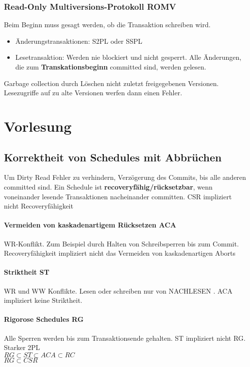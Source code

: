 \documentclass[ngerman]{scrartcl}
\begin{document}
\subsubsection{Read-Only Multiversions-Protokoll ROMV}
Beim Beginn muss gesagt werden, ob die Transaktion schreiben wird. 
\begin{itemize}
  \item Änderungstransaktionen: S2PL oder SSPL
  \item Lesetransaktion: Werden nie blockiert und nicht gesperrt. Alle Änderungen, die zum \textbf{Transkationsbeginn} committed sind, werden gelesen.
\end{itemize} 
Garbage collection durch Löschen nicht zuletzt freigegebenen Versionen. Lesezugriffe auf zu alte Versionen werfen dann einen Fehler. 



\section{Vorlesung}
\subsection{Korrektheit von Schedules mit Abbrüchen}
Um Dirty Read Fehler zu verhindern, Verzögerung des Commits, bis alle anderen committed sind. Ein Schedule ist \textbf{recoveryfähig/rücksetzbar}, wenn voneinander lesende Transaktionen  nacheinander committen. CSR impliziert nicht Recoveryfähigkeit

\paragraph{Vermeiden von kaskadenartigem Rücksetzen ACA} 
WR-Konflikt. Zum Beispiel durch Halten von Schreibsperren bis zum Commit. Recoveryfähigkeit impliziert nicht das Vermeiden von kaskadenartigen Aborts

\paragraph{Striktheit ST} 
WR und WW Konflikte. Lesen oder schreiben nur von NACHLESEN . ACA impliziert keine Striktheit.

\paragraph{Rigorose Schedules RG}
Alle Sperren werden bis zum Transaktionsende gehalten. ST impliziert nicht RG. Starker 2PL\\
$ RG \subset ST \subset ACA \subset RC $\\
$ RG \subset CSR $
\end{document}
